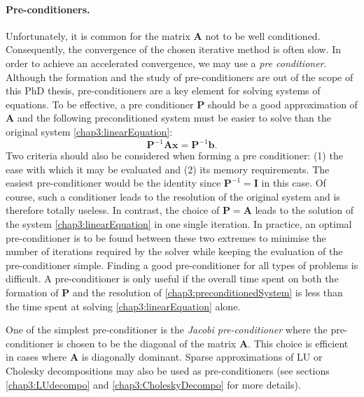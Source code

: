 \paragraph*{Pre-conditioners.}
Unfortunately, it is common for the matrix $ \mathbf{A} $ not to be well conditioned. Consequently, the convergence of the chosen iterative method is often slow. In order to achieve an accelerated convergence, we may use a \emph{pre conditioner}. Although the formation and the study of pre-conditioners are out of the scope of this PhD thesis, pre-conditioners are a key element for solving systems of equations. To be effective, a pre conditioner $ \mathbf{P} $ should be a good approximation of  $ \mathbf{A} $ and the following preconditioned system must be easier to solve than the original system \eqref{chap3:linearEquation}:
\begin{equation}
\label{chap3:preconditionedSystem}
\mathbf{P}^{-1} \mathbf{A} \mathbf{x} = \mathbf{P}^{-1} \mathbf{b}.
\end{equation}
Two criteria should also be considered when forming a pre conditioner: (1) the ease with which it may be evaluated and (2) its memory requirements. The easiest pre-conditioner would be the identity since $ \mathbf{P}^{-1} = \mathbf{I} $ in this case. Of course, such a conditioner leads to the resolution of the original system and is therefore totally useless. In contrast, the choice of $ \mathbf{P} = \mathbf{A} $ leads to the solution of the system \eqref{chap3:linearEquation} in one single iteration. In practice, an optimal pre-conditioner is to be found between these two extremes to minimise the number of iterations required by the solver while keeping the evaluation of the pre-conditioner simple. Finding a good pre-conditioner for all types of problems is difficult. A pre-conditioner is only useful if the overall time spent on both the formation of  $ \mathbf{P} $ and the resolution of \eqref{chap3:preconditionedSystem} is less than the time spent at solving \eqref{chap3:linearEquation} alone. 

One of the simplest pre-conditioner is the \emph{Jacobi pre-conditioner} where the pre-conditioner is chosen to be the diagonal of the matrix $ \mathbf{A} $. This choice is efficient in cases where $ \mathbf{A} $ is diagonally dominant. Sparse approximations of LU or Cholesky decompositions may also be used as pre-conditioners (see sections \ref{chap3:LUdecompo} and \ref{chap3:CholeskyDecompo} for more details). 

